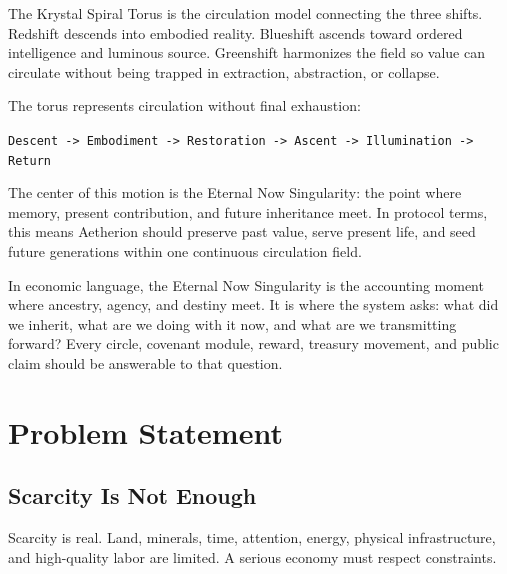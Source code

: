 \documentclass[12pt]{article}
\begin{document}
The Krystal Spiral Torus is the circulation model connecting the three shifts. Redshift descends into embodied reality. Blueshift ascends toward ordered intelligence and luminous source. Greenshift harmonizes the field so value can circulate without being trapped in extraction, abstraction, or collapse.

The torus represents circulation without final exhaustion:

\begin{center}
\texttt{Descent -> Embodiment -> Restoration -> Ascent -> Illumination -> Return}
\end{center}

The center of this motion is the Eternal Now Singularity: the point where memory, present contribution, and future inheritance meet. In protocol terms, this means Aetherion should preserve past value, serve present life, and seed future generations within one continuous circulation field.

In economic language, the Eternal Now Singularity is the accounting moment where ancestry, agency, and destiny meet. It is where the system asks: what did we inherit, what are we doing with it now, and what are we transmitting forward? Every circle, covenant module, reward, treasury movement, and public claim should be answerable to that question.



\section{Problem Statement}

\subsection{Scarcity Is Not Enough}

Scarcity is real. Land, minerals, time, attention, energy, physical infrastructure, and high-quality labor are limited. A serious economy must respect constraints.
\end{document}
